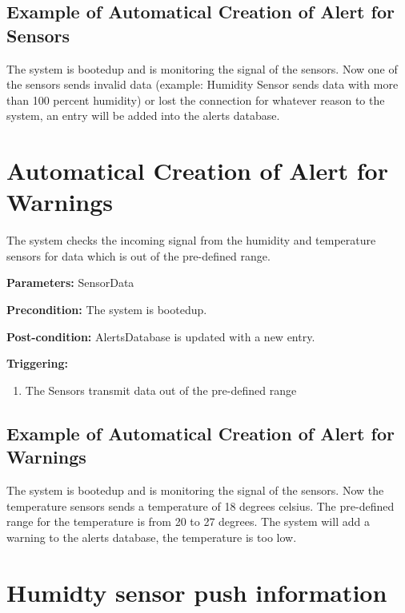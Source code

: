 \subsection{Example of Automatical Creation of Alert for Sensors}
The system is bootedup and is monitoring the signal of the sensors.
Now one of the sensors sends invalid data (example: Humidity Sensor sends data
with more than 100 percent humidity) or lost the connection for whatever reason
to the system, an entry will be added into the alerts database.




\section{Automatical Creation of Alert for Warnings}
\label{operation:AddAlertForWarnigns}
The system checks the incoming signal from the humidity and temperature sensors
for data which is out of the pre-defined range.

\begin{description}

\item \textbf{Parameters:} SensorData
\item \textbf{Precondition:} The system is bootedup.
\item \textbf{Post-condition:} AlertsDatabase is updated with a new entry.

\item \textbf{Triggering:}
\begin{enumerate}
\item The Sensors transmit data out of the pre-defined range
\end{enumerate}
\end{description}

\subsection{Example of Automatical Creation of Alert for Warnings}
The system is bootedup and is monitoring the signal of the sensors.
Now the temperature sensors sends a temperature of 18 degrees celsius. The
pre-defined range for the temperature is from 20 to 27 degrees. The system will
add a warning to the alerts database, the temperature is too low.






\break



\section{Humidty sensor push information}

